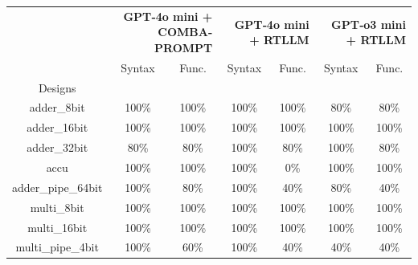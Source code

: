 \begin{tabular}{c|cc|cc|cc}
\toprule
 & \multicolumn{2}{r}{\bfseries GPT‑4o mini + COMBA-PROMPT} & \multicolumn{2}{r}{\bfseries GPT‑4o mini + RTLLM } & \multicolumn{2}{r}{\bfseries GPT‑o3 mini + RTLLM } \\
 & Syntax & Func. & Syntax & Func. & Syntax & Func. \\
Designs &  &  &  &  &  &  \\
\midrule
adder\_8bit & \color{black} {\cellcolor{lightblue}} 100\% & \color{black} {\cellcolor{lightgreen}} 100\% & \color{black} {\cellcolor{lightblue}} 100\% & \color{black} {\cellcolor{lightgreen}} 100\% & 80\% & 80\% \\ \midrule
adder\_16bit & \color{black} {\cellcolor{lightblue}} 100\% & \color{black} {\cellcolor{lightgreen}} 100\% & \color{black} {\cellcolor{lightblue}} 100\% & \color{black} {\cellcolor{lightgreen}} 100\% & \color{black} {\cellcolor{lightblue}} 100\% & \color{black} {\cellcolor{lightgreen}} 100\% \\ \midrule
adder\_32bit & 80\% & \color{black} {\cellcolor{lightgreen}} 80\% & \color{black} {\cellcolor{lightblue}} 100\% & \color{black} {\cellcolor{lightgreen}} 80\% & \color{black} {\cellcolor{lightblue}} 100\% & \color{black} {\cellcolor{lightgreen}} 80\% \\ \midrule
accu & \color{black} {\cellcolor{lightblue}} 100\% & \color{black} {\cellcolor{lightgreen}} 100\% & \color{black} {\cellcolor{lightblue}} 100\% & 0\% & \color{black} {\cellcolor{lightblue}} 100\% & \color{black} {\cellcolor{lightgreen}} 100\% \\ \midrule
adder\_pipe\_64bit & \color{black} {\cellcolor{lightblue}} 100\% & \color{black} {\cellcolor{lightgreen}} 80\% & \color{black} {\cellcolor{lightblue}} 100\% & 40\% & 80\% & 40\% \\ \midrule
multi\_8bit & \color{black} {\cellcolor{lightblue}} 100\% & \color{black} {\cellcolor{lightgreen}} 100\% & \color{black} {\cellcolor{lightblue}} 100\% & \color{black} {\cellcolor{lightgreen}} 100\% & \color{black} {\cellcolor{lightblue}} 100\% & \color{black} {\cellcolor{lightgreen}} 100\% \\ \midrule
multi\_16bit & \color{black} {\cellcolor{lightblue}} 100\% & \color{black} {\cellcolor{lightgreen}} 100\% & \color{black} {\cellcolor{lightblue}} 100\% & \color{black} {\cellcolor{lightgreen}} 100\% & \color{black} {\cellcolor{lightblue}} 100\% & \color{black} {\cellcolor{lightgreen}} 100\% \\ \midrule
multi\_pipe\_4bit & \color{black} {\cellcolor{lightblue}} 100\% & \color{black} {\cellcolor{lightgreen}} 60\% & \color{black} {\cellcolor{lightblue}} 100\% & 40\% & 40\% & 40\% \\ \midrule

\end{tabular}
